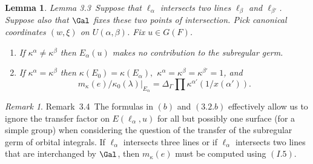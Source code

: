 \documentclass{memo-l}
\newtheorem{lemma}[theorem]{Lemma}
\theoremstyle{definition}
\theoremstyle{remark}
\newtheorem{remark}[theorem]{Remark}
\numberwithin{section}{chapter}
\numberwithin{equation}{chapter}
\begin{document}
{\medskip}

\begin{lemma}{Lemma 3.3}\ Suppose that ${\ell}_{{\alpha}}$
intersects two lines ${\ell}_{{\beta}}$ and ${\ell}_{{\beta}'}$. Suppose also that
$\Gal$ fixes these two points of intersection.  Pick canonical
coordinates $(w,{\xi})$ on $U({\alpha},{\beta})$.  Fix $u  \in  G(F)$.
\begin{enumerate}[label=\alph*)]
\item If ${\kappa}^{{\alpha}} \ne {\kappa}^{{\beta}}$ then $E_{{\alpha}}(u)$
makes no contribution to the subregular germ.
\item If ${\kappa}^{{\alpha}} = {\kappa}^{{\beta}}$ then ${\kappa}(E_{0})  = 
{\kappa}(E_{{\alpha}}),$
${\kappa}^{{\alpha}} ={\kappa}^{{\beta}} = {\kappa}^{{\beta}'} = 1$, and
$$m_{{\kappa}}(e)/{\kappa}_{0}({\lambda})\vert _{E_\alpha}  = 
{\Delta}_{{\Gamma}}\prod{\kappa}^{{\alpha}'}(1/x({\alpha}')).$$
\end{enumerate}
\end{lemma}

\begin{remark}{Remark\ 3.4}\ The formulas in $(b)$ and $(3.2.b)$ effectively
allow us to ignore the transfer factor on $E({\ell}_{{\alpha}},u)$ for all
but possibly one surface (for a simple group) when considering the question
of the transfer of the subregular germ of orbital integrals.  If
${\ell}_{{\alpha}}$ intersects three lines or if ${\ell}_{{\alpha}}$
intersects two lines that are interchanged by $\Gal$, then
$m_{{\kappa}}(e)$ must be computed using $(I.5)$.
\end{remark}
\end{document}
